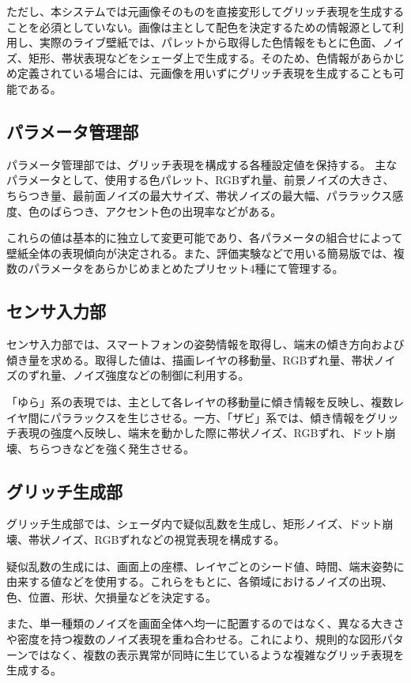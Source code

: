 ただし、本システムでは元画像そのものを直接変形してグリッチ表現を生成することを必須としていない。画像は主として配色を決定するための情報源として利用し、実際のライブ壁紙では、パレットから取得した色情報をもとに色面、ノイズ、矩形、帯状表現などをシェーダ上で生成する。そのため、色情報があらかじめ定義されている場合には、元画像を用いずにグリッチ表現を生成することも可能である。


\subsection{パラメータ管理部}

パラメータ管理部では、グリッチ表現を構成する各種設定値を保持する。
主なパラメータとして、使用する色パレット、RGBずれ量、前景ノイズの大きさ、ちらつき量、最前面ノイズの最大サイズ、帯状ノイズの最大幅、パララックス感度、色のばらつき、アクセント色の出現率などがある。

これらの値は基本的に独立して変更可能であり、各パラメータの組合せによって壁紙全体の表現傾向が決定される。また、評価実験などで用いる簡易版では、複数のパラメータをあらかじめまとめたプリセット4種にて管理する。


\subsection{センサ入力部}

センサ入力部では、スマートフォンの姿勢情報を取得し、端末の傾き方向および傾き量を求める。取得した値は、描画レイヤの移動量、RGBずれ量、帯状ノイズのずれ量、ノイズ強度などの制御に利用する。

「ゆら」系の表現では、主として各レイヤの移動量に傾き情報を反映し、複数レイヤ間にパララックスを生じさせる。一方、「ザビ」系では、傾き情報をグリッチ表現の強度へ反映し、端末を動かした際に帯状ノイズ、RGBずれ、ドット崩壊、ちらつきなどを強く発生させる。


\subsection{グリッチ生成部}

グリッチ生成部では、シェーダ内で疑似乱数を生成し、矩形ノイズ、ドット崩壊、帯状ノイズ、RGBずれなどの視覚表現を構成する。

疑似乱数の生成には、画面上の座標、レイヤごとのシード値、時間、端末姿勢に由来する値などを使用する。これらをもとに、各領域におけるノイズの出現、色、位置、形状、欠損量などを決定する。

また、単一種類のノイズを画面全体へ均一に配置するのではなく、異なる大きさや密度を持つ複数のノイズ表現を重ね合わせる。これにより、規則的な図形パターンではなく、複数の表示異常が同時に生じているような複雑なグリッチ表現を生成する。



